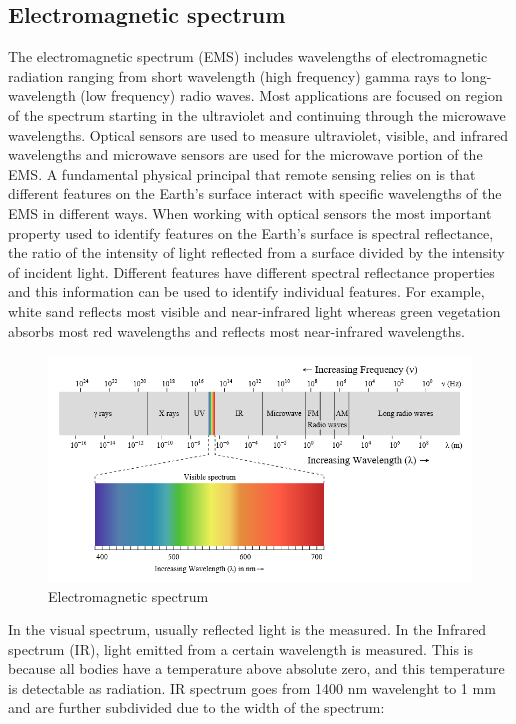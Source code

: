     \subsection{Electromagnetic spectrum}

    The electromagnetic spectrum (EMS) includes wavelengths of electromagnetic radiation ranging from short wavelength (high frequency) gamma rays to long-wavelength (low frequency) radio waves. 
    Most applications are focused on region of the spectrum starting in the ultraviolet and continuing through the microwave wavelengths. 
    Optical sensors are used to measure ultraviolet, visible, and infrared wavelengths and microwave sensors are used for the microwave portion of the EMS.
    A fundamental physical principal that remote sensing relies on is that different features on the Earth's surface interact with specific wavelengths of the EMS in different ways.
    When working with optical sensors the most important property used to identify features on the Earth's surface is spectral reflectance, the ratio of the intensity of light reflected from a surface divided by the intensity of incident light.
    Different features have different spectral reflectance properties and this information can be used to identify individual features.
    For example, white sand reflects most visible and near-infrared light whereas green vegetation absorbs most red wavelengths and reflects most near-infrared wavelengths.    

    \begin{figure}[H]
        \centering
        \includegraphics[width=\textwidth]{Includes/1-electromagnetic-spectrum.png}
        \caption{Electromagnetic spectrum}
        \label{fig:1-electromagnetic-spectrum}
    \end{figure}

    In the visual spectrum, usually reflected light is the measured. 
    In the Infrared spectrum (IR), light emitted from a certain wavelength is measured.
    This is because all bodies have a temperature above absolute zero, and this temperature is detectable as radiation.
    IR spectrum goes from 1400 nm wavelenght to 1 mm and are further subdivided due to the width of the spectrum:

